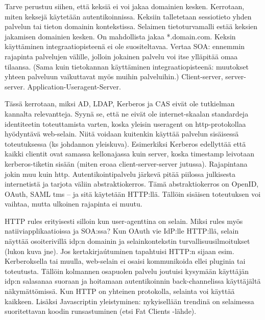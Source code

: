 \documentclass[finnish,gradu]{tktltiki}
\begin{document}
  Tarve perustuu siihen, että keksiä ei voi jakaa domainien kesken. Kerrotaan, miten keksejä käytetään autentikoinnissa. Keksiin talletetaan sessiotieto yhden palvelun tai tieton domainin kontekstissa. Selaimen tietoturvamalli estää keksien jakamisen domainien kesken. On mahdollista
jakaa *.domain.com. Keksin käyttäminen integraatiopisteenä ei ole suositeltavaa. Vertaa SOA:
ennemmin rajapinta palvelujen välille, jolloin jokainen palvelu voi itse ylläpitää omaa tilaansa.
(Sama kuin tietokannan käyttäminen integraatiopisteenä: muutokset yhteen palveluun vaikuttavat
myös muihin palveluihin.) Client-server, server-server. Application-Useragent-Server.



  Tässä kerrotaan, miksi AD, LDAP, Kerberos ja CAS eivät ole tutkielman kannalta relevantteja. Syynä se, että ne eivät ole internet-skaalan standardeja identiteetin toteuttamista varten, koska yleisin useragent on http-protokollaa hyödyntävä web-selain. Niitä voidaan kuitenkin käyttää palvelun sisäisessä toteutuksessa (ks johdannon yleiskuva). Esimerkiksi Kerberos edellyttää että kaikki clientit ovat samassa kellonajassa kuin server, koska timestamp leivotaan kerberos-tiketin sisään (miten eroaa client-server-server jutussa). Rajapintana jokin muu kuin http. Autentikointipalvelu järkevä pitää piilossa julkisesta internetistä ja tarjota väliin abstraktiokerros. Tämä abstraktiokerros on OpenID, OAuth, SAML tms -- ja sitä käytetään HTTP:llä. Tällöin sisäisen toteutuksen voi vaihtaa, mutta ulkoinen rajapinta ei muutu.

  HTTP rules erityisesti silloin kun user-agenttina on selain. Miksi rules myös natiiviapplikaatioissa ja SOA:ssa?
  Kun OAuth vie IdP:lle HTTP:llä, selain näyttää osoiterivillä idp:n domainin ja selainkontekstin turvallisuusilmoitukset (lukon kuva jne). Jos kertakirjaútuminen tapahtuisi HTTP:n sijaan esim. Kerberoksella tai muulla, web-selain ei osaisi kommunikoida ellei pluginia tai toteutusta. Tällöin kolmannen osapuolen palvelu joutuisi kysymään käyttäjän idp:n salasanaa suoraan ja hoitamaan autentikoinnin back-channelissa käyttäjältä näkymättömissä.
  Kun HTTP on yhteinen protokolla, selainta voi käyttää kaikkeen. Lisäksi Javascriptin yleistyminen: nykyisellään trendinä on selaimessa suoritettavan koodin runsastuminen (etsi Fat Clients -lähde).
\end{document}

